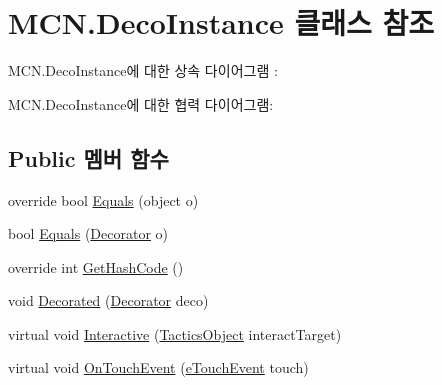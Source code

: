 \hypertarget{class_m_c_n_1_1_deco_instance}{}\section{M\+C\+N.\+Deco\+Instance 클래스 참조}
\label{class_m_c_n_1_1_deco_instance}


M\+C\+N.\+Deco\+Instance에 대한 상속 다이어그램 \+: 


M\+C\+N.\+Deco\+Instance에 대한 협력 다이어그램\+:
\subsection*{Public 멤버 함수}
\begin{DoxyCompactItemize}
\item 
override bool \hyperlink{class_m_c_n_1_1_deco_instance_ac327fa53871e183c0e46ac9c66ba00bc}{Equals} (object o)
\item 
bool \hyperlink{class_m_c_n_1_1_deco_instance_a179363468337afa0d1401ff9da1813f0}{Equals} (\hyperlink{class_m_c_n_1_1_decorator}{Decorator} o)
\item 
override int \hyperlink{class_m_c_n_1_1_deco_instance_ab8768bdf4ece9568cc120411c286bfb5}{Get\+Hash\+Code} ()
\item 
void \hyperlink{class_m_c_n_1_1_deco_instance_af6c8520c7bb40840651026e3693afcb4}{Decorated} (\hyperlink{class_m_c_n_1_1_decorator}{Decorator} deco)
\item 
virtual void \hyperlink{class_tactics_object_a5f94ed01497a7072a2785163f4cbc57b}{Interactive} (\hyperlink{class_tactics_object}{Tactics\+Object} interact\+Target)
\item 
virtual void \hyperlink{class_tactics_object_a0353d47981c71db7fe32bd414f025e9b}{On\+Touch\+Event} (\hyperlink{_touch_manager_8cs_ae33e321a424fe84ba8b2fdb81ad40a68}{e\+Touch\+Event} touch)
\end{DoxyCompactItemize}
